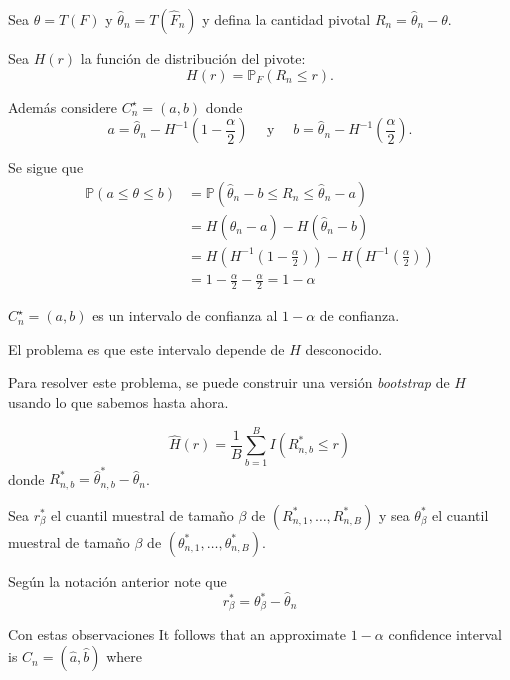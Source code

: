 \documentclass[
  12pt,
]{book}
\theoremstyle{definition}
\theoremstyle{definition}
\theoremstyle{definition}
\theoremstyle{remark}
\let\BeginKnitrBlock\begin \let\EndKnitrBlock\end
\begin{document}
Sea \(\theta=T(F)\) y \(\widehat{\theta}_{n}=T\left(\widehat{F}_{n}\right)\) y defina la cantidad pivotal \(R_{n}=\widehat{\theta}_{n}-\theta .\)

Sea \(H(r)\) la función de distribución del pivote:
\[
H(r)=\mathbb{P}_{F}\left(R_{n} \leq r\right).
\]

Además considere \(C_{n}^{\star}=(a, b)\) donde
\[
a=\widehat{\theta}_{n}-H^{-1}\left(1-\frac{\alpha}{2}\right) \quad \text { y } \quad b=\widehat{\theta}_{n}-H^{-1}\left(\frac{\alpha}{2}\right).
\]

Se sigue que
\begin{align*}
\mathbb{P}(a \leq \theta \leq b)
&=\mathbb{P}\left(\widehat{\theta}_{n}-b \leq R_{n} \leq \widehat{\theta}_{n}-a\right) \\
&=H\left(\widehat{\theta}_{n}-a\right)-H\left(\widehat{\theta}_{n}-b\right) \\
&=H\left(H^{-1}\left(1-\frac{\alpha}{2}\right)\right)-H\left(H^{-1}\left(\frac{\alpha}{2}\right)\right) \\
&=1-\frac{\alpha}{2}-\frac{\alpha}{2}=1-\alpha
\end{align*}
\BeginKnitrBlock{remark}
{}\(C_{n}^{\star}=(a, b)\) es un intervalo de confianza al \(1-\alpha\) de confianza.

El problema es que este intervalo depende de \(H\) desconocido.
\EndKnitrBlock{remark}

Para resolver este problema, se puede construir una versión \emph{bootstrap} de \(H\) usando lo que sabemos hasta ahora.

\[
\widehat{H}(r)=\frac{1}{B} \sum_{b=1}^{B} I\left(R_{n, b}^{*} \leq r\right)
\]
donde \(R_{n, b}^{*}=\widehat{\theta}_{n, b}^{*}-\widehat{\theta}_{n}\).

Sea \(r_{\beta}^{*}\) el cuantil muestral de tamaño \(\beta\) de \(\left(R_{n, 1}^{*}, \ldots, R_{n, B}^{*}\right)\) y sea \(\theta_{\beta}^{*}\) el cuantil muestral de tamaño \(\beta\) de \(\left(\theta_{n, 1}^{*}, \ldots, \theta_{n, B}^{*}\right)\).

\BeginKnitrBlock{remark}
{}Según la notación anterior note que
\begin{equation*}
r_{\beta}^{*}= \theta_{\beta}^{*}-\widehat{\theta}_{n}
\end{equation*}
\EndKnitrBlock{remark}

Con estas observaciones
It follows that an approximate \(1-\alpha\) confidence interval is \(C_{n}=(\widehat{a}, \widehat{b})\) where
\end{document}
